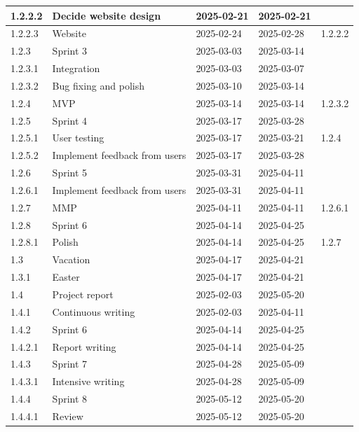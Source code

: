 \begin{table}[H]
\begin{tabular}{|l|l|l|l|l|}
        1.2.2.2 & Decide website design & 2025-02-21 & 2025-02-21 & ~ \\ \hline
        1.2.2.3 & Website & 2025-02-24 & 2025-02-28 & 1.2.2.2 \\ \hline
        1.2.3 & Sprint 3 & 2025-03-03 & 2025-03-14 & ~ \\ \hline
        1.2.3.1 & Integration & 2025-03-03 & 2025-03-07 & ~ \\ \hline
        1.2.3.2 & Bug fixing and polish & 2025-03-10 & 2025-03-14 & ~ \\ \hline
        1.2.4 & MVP & 2025-03-14 & 2025-03-14 & 1.2.3.2 \\ \hline
        1.2.5 & Sprint 4 & 2025-03-17 & 2025-03-28 & ~ \\ \hline
        1.2.5.1 & User testing & 2025-03-17 & 2025-03-21 & 1.2.4 \\ \hline
        1.2.5.2 & Implement feedback from users & 2025-03-17 & 2025-03-28 & ~ \\ \hline
        1.2.6 & Sprint 5 & 2025-03-31 & 2025-04-11 & ~ \\ \hline
        1.2.6.1 & Implement feedback from users & 2025-03-31 & 2025-04-11 & ~ \\ \hline
        1.2.7 & MMP & 2025-04-11 & 2025-04-11 & 1.2.6.1 \\ \hline
        1.2.8 & Sprint 6 & 2025-04-14 & 2025-04-25 & ~ \\ \hline
        1.2.8.1 & Polish & 2025-04-14 & 2025-04-25 & 1.2.7 \\ \hline
        1.3 & Vacation & 2025-04-17 & 2025-04-21 & ~ \\ \hline
        1.3.1 & Easter & 2025-04-17 & 2025-04-21 & ~ \\ \hline
        1.4 & Project report & 2025-02-03 & 2025-05-20 & ~ \\ \hline
        1.4.1 & Continuous writing & 2025-02-03 & 2025-04-11 & ~ \\ \hline
        1.4.2 & Sprint 6 & 2025-04-14 & 2025-04-25 & ~ \\ \hline
        1.4.2.1 & Report writing & 2025-04-14 & 2025-04-25 & ~ \\ \hline
        1.4.3 & Sprint 7 & 2025-04-28 & 2025-05-09 & ~ \\ \hline
        1.4.3.1 & Intensive writing & 2025-04-28 & 2025-05-09 & ~ \\ \hline
        1.4.4 & Sprint 8 & 2025-05-12 & 2025-05-20 & ~ \\ \hline
        1.4.4.1 & Review & 2025-05-12 & 2025-05-20 & ~ \\ \hline

\end{tabular}
\end{table}
